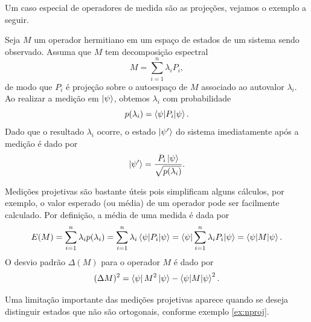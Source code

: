 Um caso especial de operadores de medida são as projeções, vejamos o exemplo a seguir.

\begin{example}\label{ex:proj}
    Seja $M$ um operador hermitiano em um espaço de estados de um sistema sendo observado. Assuma que $M$ tem decomposição espectral
\begin{equation}
    M = \sum_{i=1}^n \lambda_i P_i,
\end{equation}
de modo que $P_i$ é projeção sobre o autoespaço de $M$ associado ao autovalor $\lambda_i$. Ao realizar a medição em $\ket{\psi}$, obtemos $\lambda_i$ com probabilidade
\begin{equation}
    p(\lambda_i) = \braket{\psi|P_i|\psi}.
\end{equation}
Dado que o resultado $\lambda_i$ ocorre, o estado $\ket{\psi'}$ do sistema imediatamente após a medição é dado por
\begin{equation}
    \ket{\psi'} = \frac{P_i\ket{\psi}}{\sqrt{p(\lambda_i)}}.
\end{equation}
\end{example}

Medições projetivas são bastante úteis pois simplificam alguns cálculos, por exemplo, o valor esperado (ou média) de um operador pode ser facilmente calculado. Por definição, a média de uma medida é dada por
\begin{equation}\label{eq:expec}
    E(M) = \sum_{i=1}^n \lambda_i p(\lambda_i) = \sum_{i=1}^n \lambda_i \braket{\psi|P_i|\psi} = \braket{\psi|\sum_{i=1}^n \lambda_i P_i|\psi} = \braket{\psi|M|\psi}.
\end{equation}
O desvio padrão $\Delta(M)$ para o operador $M$ é dado por
\begin{equation}
(\Delta M)^2
= \bra{\psi} M^2 \ket{\psi} - \braket{\psi | M |\psi}^2.
\end{equation}

Uma limitação importante das medições projetivas aparece quando se deseja distinguir estados que não são ortogonais, conforme exemplo \ref{ex:nproj}.

